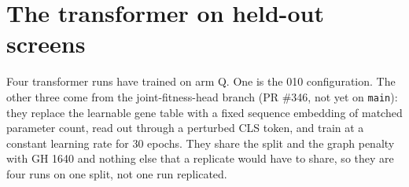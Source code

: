 
\section{The transformer on held-out screens}
\label{sec:disjoint}

Four transformer runs have trained on arm Q. One is the 010 configuration. The other
three come from the joint-fitness-head branch (PR \#346, not yet on \texttt{main}):
they replace the learnable gene table with a fixed sequence embedding of matched
parameter count, read out through a perturbed CLS token, and train at a constant
learning rate for 30 epochs. They share the split and the graph penalty with GH 1640
and nothing else that a replicate would have to share, so they are four runs on one
split, not one run replicated.

\begin{table}[htbp]
\centering
\footnotesize
\caption{Every transformer run on arm Q. Epochs is the number logged: GH 1640 was
stopped by the 12 hour wall clock partway through epoch 36, and the IGB runs finished
their 30. The validation maximum is an upward-biased order statistic over the logged
epochs. No run has a test score. Configs of the IGB runs are on branch
\texttt{feat/025-fitness-joint-head}.}
\label{tab:disjointruns}

\end{table}


